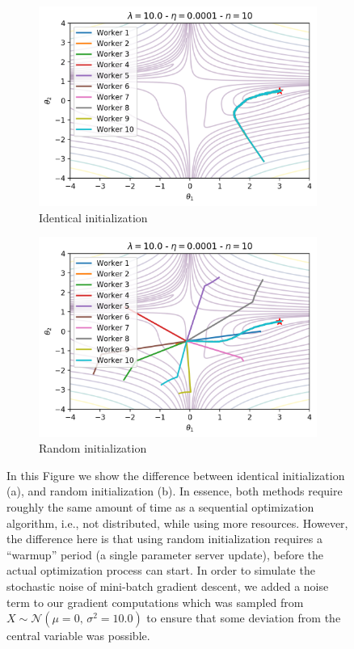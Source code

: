 \begin{figure}[H]
  \centering
  \begin{subfigure}{.49\textwidth}
    \centering
    \includegraphics[width=\linewidth]{resources/images/model_averaging_identical_starting_point}
    \caption{Identical initialization}
  \end{subfigure}
  \begin{subfigure}{.49\textwidth}
    \centering
    \includegraphics[width=\linewidth]{resources/images/model_averaging_cf_10}
    \caption{Random initialization}
  \end{subfigure}
  \caption{In this Figure we show the difference between identical initialization (a), and random initialization (b). In essence, both methods require roughly the same amount of time as a sequential optimization algorithm, i.e., not distributed, while using more resources. However, the difference here is that using random initialization requires a ``warmup'' period (a single parameter server update), before the actual optimization process can start. In order to simulate the stochastic noise of mini-batch gradient descent, we added a noise term to our gradient computations which was sampled from $X \sim \mathcal{N}(\mu = 0,\,\sigma^{2} = 10.0)$ to ensure that some deviation from the central variable was possible.}
  \label{fig:model_averaging_slow}
\end{figure}

